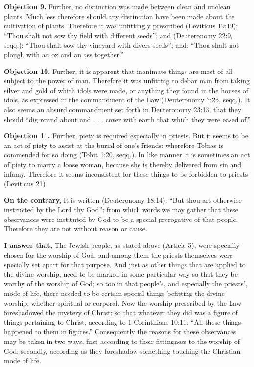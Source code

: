 \textbf{Objection 9.} Further, no distinction was made between clean and unclean plants. Much less therefore should any distinction have been made about the cultivation of plants. Therefore it was unfittingly prescribed (Leviticus 19:19): ``Thou shalt not sow thy field with different seeds''; and (Deuteronomy 22:9, seqq.): ``Thou shalt sow thy vineyard with divers seeds''; and: ``Thou shalt not plough with an ox and an ass together.''

\textbf{Objection 10.} Further, it is apparent that inanimate things are most of all subject to the power of man. Therefore it was unfitting to debar man from taking silver and gold of which idols were made, or anything they found in the houses of idols, as expressed in the commandment of the Law (Deuteronomy 7:25, seqq.). It also seems an absurd commandment set forth in Deuteronomy 23:13, that they should ``dig round about and . . . cover with earth that which they were eased of.''

\textbf{Objection 11.} Further, piety is required especially in priests. But it seems to be an act of piety to assist at the burial of one's friends: wherefore Tobias is commended for so doing (Tobit 1:20, seqq.). In like manner it is sometimes an act of piety to marry a loose woman, because she is thereby delivered from sin and infamy. Therefore it seems inconsistent for these things to be forbidden to priests (Leviticus 21).

\textbf{On the contrary,} It is written (Deuteronomy 18:14): ``But thou art otherwise instructed by the Lord thy God'': from which words we may gather that these observances were instituted by God to be a special prerogative of that people. Therefore they are not without reason or cause.

\textbf{I answer that,} The Jewish people, as stated above (Article 5), were specially chosen for the worship of God, and among them the priests themselves were specially set apart for that purpose. And just as other things that are applied to the divine worship, need to be marked in some particular way so that they be worthy of the worship of God; so too in that people's, and especially the priests', mode of life, there needed to be certain special things befitting the divine worship, whether spiritual or corporal. Now the worship prescribed by the Law foreshadowed the mystery of Christ: so that whatever they did was a figure of things pertaining to Christ, according to 1 Corinthians 10:11: ``All these things happened to them in figures.'' Consequently the reasons for these observances may be taken in two ways, first according to their fittingness to the worship of God; secondly, according as they foreshadow something touching the Christian mode of life.

